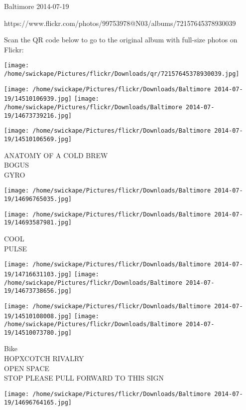 \documentclass[10pt,letterpaper]{article}
\begin{document}
Baltimore 2014-07-19

https://www.flickr.com/photos/99753978@N03/albums/72157645378930039

Scan the QR code below to go to the original album with full-size photos on Flickr:

\texttt{[image: /home/swickape/Pictures/flickr/Downloads/qr/72157645378930039.jpg]}
\pagebreak

\texttt{[image: /home/swickape/Pictures/flickr/Downloads/Baltimore 2014-07-19/14510106939.jpg]}
\texttt{[image: /home/swickape/Pictures/flickr/Downloads/Baltimore 2014-07-19/14673739216.jpg]}

\vspace{0.25in}
\texttt{[image: /home/swickape/Pictures/flickr/Downloads/Baltimore 2014-07-19/14510106569.jpg]}

ANATOMY OF A COLD BREW\\
BOGUS\\
GYRO\\
\pagebreak

\texttt{[image: /home/swickape/Pictures/flickr/Downloads/Baltimore 2014-07-19/14696765035.jpg]}

\vspace{0.25in}
\texttt{[image: /home/swickape/Pictures/flickr/Downloads/Baltimore 2014-07-19/14693587981.jpg]}

COOL\\
PULSE\\
\pagebreak

\texttt{[image: /home/swickape/Pictures/flickr/Downloads/Baltimore 2014-07-19/14716631103.jpg]}
\texttt{[image: /home/swickape/Pictures/flickr/Downloads/Baltimore 2014-07-19/14673738656.jpg]}

\texttt{[image: /home/swickape/Pictures/flickr/Downloads/Baltimore 2014-07-19/14510108008.jpg]}
\texttt{[image: /home/swickape/Pictures/flickr/Downloads/Baltimore 2014-07-19/14510073780.jpg]}

Bike\\
HOPXCOTCH RIVALRY\\
OPEN SPACE\\
STOP PLEASE PULL FORWARD TO THIS SIGN\\
\pagebreak

\texttt{[image: /home/swickape/Pictures/flickr/Downloads/Baltimore 2014-07-19/14696764165.jpg]}
\end{document}
